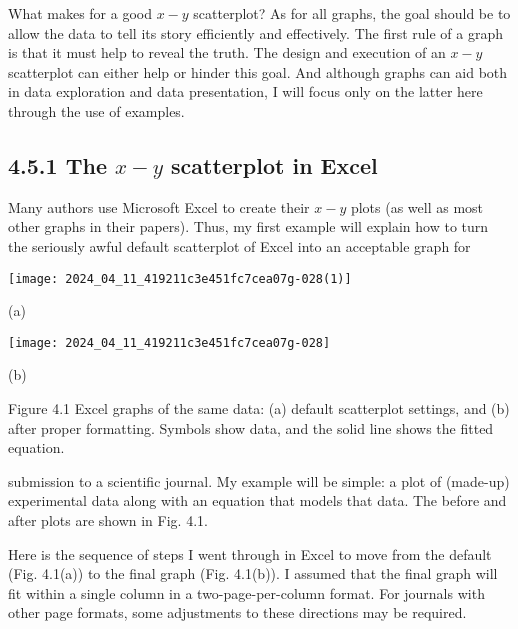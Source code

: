 What makes for a good $x-y$ scatterplot? As for all graphs, the goal should be to allow the data to tell its story efficiently and effectively. The first rule of a graph is that it must help to reveal the truth. The design and execution of an $x-y$ scatterplot can either help or hinder this goal. And although graphs can aid both in data exploration and data presentation, I will focus only on the latter here through the use of examples.

\subsection*{4.5.1 The $x-y$ scatterplot in Excel}
Many authors use Microsoft Excel to create their $x-y$ plots (as well as most other graphs in their papers). Thus, my first example will explain how to turn the seriously awful default scatterplot of Excel into an acceptable graph for

\begin{center}
\texttt{[image: 2024\_04\_11\_419211c3e451fc7cea07g-028(1)]}
\end{center}

(a)

\begin{center}
\texttt{[image: 2024\_04\_11\_419211c3e451fc7cea07g-028]}
\end{center}

(b)

Figure 4.1 Excel graphs of the same data: (a) default scatterplot settings, and (b) after proper formatting. Symbols show data, and the solid line shows the fitted equation.

submission to a scientific journal. My example will be simple: a plot of (made-up) experimental data along with an equation that models that data. The before and after plots are shown in Fig. 4.1.

Here is the sequence of steps I went through in Excel to move from the default (Fig. 4.1(a)) to the final graph (Fig. 4.1(b)). I assumed that the final graph will fit within a single column in a two-page-per-column format. For journals with other page formats, some adjustments to these directions may be required.

